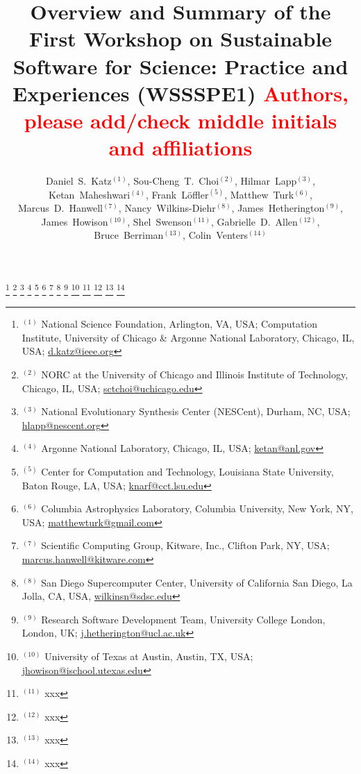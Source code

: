 \documentclass[11pt, oneside]{amsart}
\newcommand{\note}[1]{ {\textcolor{red}    { #1 }}}
\begin{document}
\title[]{Overview and Summary of the First Workshop on Sustainable Software for Science: Practice and Experiences (WSSSPE1)
\note{\scriptsize Authors, please add/check middle initials and affiliations}}

\author{Daniel~S.~Katz$^{(1)}$,
Sou-Cheng~T.~Choi$^{(2)}$,
Hilmar~Lapp$^{(3)}$,
Ketan~Maheshwari$^{(4)}$,
Frank~Löffler$^{(5)}$,
Matthew~Turk$^{(6)}$,
Marcus~D.~Hanwell$^{(7)}$,
Nancy~Wilkins-Diehr$^{(8)}$,
James~Hetherington$^{(9)}$,
James~Howison$^{(10)}$,
Shel~Swenson$^{(11)}$,
Gabrielle~D.~Allen$^{(12)}$,
Bruce~Berriman$^{(13)}$,
Colin~Venters$^{(14)}$
}

\thanks{{}$^{(1)}$ National Science Foundation, Arlington, VA, USA; Computation Institute, University of Chicago \& Argonne National Laboratory, Chicago, IL, USA; \url{d.katz@ieee.org}}
%
\thanks{{}$^{(2)}$ NORC at the University of Chicago and   Illinois Institute of Technology, Chicago, IL, USA; \url{sctchoi@uchicago.edu}}
%
\thanks{{}$^{(3)}$ National Evolutionary Synthesis Center (NESCent),
  Durham, NC, USA; \url{hlapp@nescent.org}}
%
\thanks{{}$^{(4)}$ Argonne National Laboratory, Chicago, IL, USA; \url{ketan@anl.gov}}
%
\thanks{{}$^{(5)}$ Center for Computation and Technology, Louisiana State University, Baton Rouge, LA, USA; \url{knarf@cct.lsu.edu}}
%
\thanks{{}$^{(6)}$ Columbia Astrophysics Laboratory, Columbia University, New
York, NY, USA; \url{matthewturk@gmail.com}}
%
\thanks{{}$^{(7)}$ Scientific Computing Group, Kitware, Inc.,  Clifton Park, NY, USA; \url{marcus.hanwell@kitware.com}}
%
\thanks{{}$^{(8)}$ San Diego Supercomputer Center, University of California San Diego, La Jolla, CA, USA, \url{wilkinsn@sdsc.edu}}
%
\thanks{{}$^{(9)}$ Research Software Development Team, University College London, London, UK; \url {j.hetherington@ucl.ac.uk}}
%
\thanks{{}$^{(10)}$ University of Texas at Austin, Austin, TX, USA; \url{jhowison@ischool.utexas.edu}}
%
\thanks{{}$^{(11)}$ xxx}
%
\thanks{{}$^{(12)}$ xxx}
%
\thanks{{}$^{(13)}$ xxx}
%
\thanks{{}$^{(14)}$ xxx}
\end{document}
